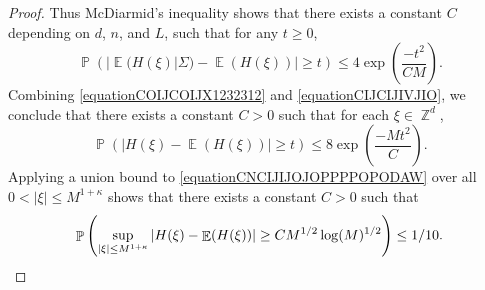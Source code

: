 \documentclass[dvipsnames,letterpaper,12pt]{article}
\numberwithin{equation}{section}
\DeclareMathOperator{\ZZ}{\mathbb{Z}}
\numberwithin{theorem}{section}
\DeclareMathOperator{\EE}{\mathbb{E}}
\DeclareMathOperator{\PP}{\mathbb{P}}
\begin{document}
\begin{proof}
    Thus McDiarmid's inequality shows that there exists a constant $C$ depending on $d$, $n$, and $L$, such that for any $t \geq 0$,
    \begin{equation} \label{equationCIJCIJIVJIO}
        \PP \left( |\EE(H(\xi)|\Sigma) - \EE(H(\xi))| \geq t \right) \leq 4 \exp \left( \frac{-t^2}{C M} \right).
    \end{equation}
    Combining \eqref{equationCOIJCOIJX1232312} and \eqref{equationCIJCIJIVJIO}, we conclude that there exists a constant $C > 0$ such that for each $\xi \in \ZZ^d$,
    \begin{equation} \label{equationCNCIJIJOJOPPPPOPODAW}
        \PP \left( | H(\xi) - \EE(H(\xi)) | \geq t  \right) \leq 8 \exp \left( \frac{-M t^2}{C} \right).
    \end{equation}
    Applying a union bound to \eqref{equationCNCIJIJOJOPPPPOPODAW} over all $0 < |\xi| \leq M^{1 + \kappa}$ shows that there exists a constant $C > 0$ such that
    \[ \PP \left( \sup_{|\xi| \leq M^{1 + \kappa}} | H(\xi) - \EE(H(\xi)) | \geq C M^{1/2} \log(M)^{1/2} \right) \leq 1/10. \qedhere \]
\end{proof}
\end{document}
